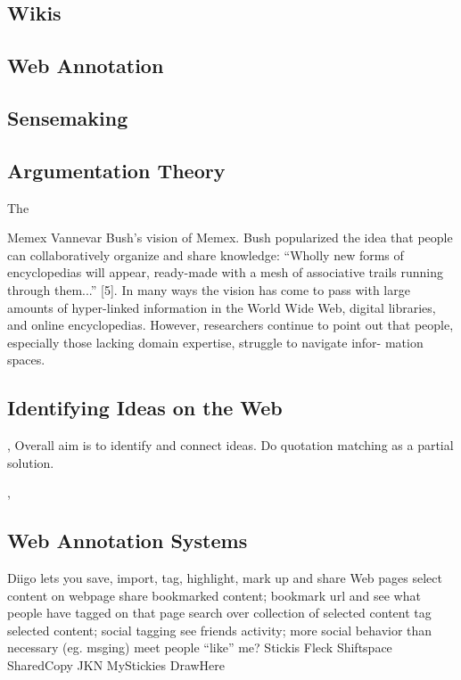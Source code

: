 \documentclass{chi2009}
\begin{document}
\subsection{Wikis}

\subsection{Web Annotation}

\subsection{Sensemaking}

\cite{scenthighlights}\cite{scenttrails}

\subsection{Argumentation Theory}

The 
\cite{Korb97acognitive}
\cite{toulmin}
\cite{carneades}
\cite{conceptmap}
\cite{argmas}

Memex
Vannevar 
Bush's vision of Memex. Bush popularized the idea that 
people can collaboratively organize and share knowledge: 
``Wholly new forms of encyclopedias will appear, ready-made 
with a mesh of associative trails running through them...'' 
[5]. In many ways the vision has come to pass with large 
amounts of hyper-linked information in the World Wide 
Web, digital libraries, and online encyclopedias. However, 
researchers continue to point out that people, especially 
those lacking domain expertise, struggle to navigate infor- 
mation spaces. 


\subsection{Identifying Ideas on the Web}

\cite{quotations}, \cite{quotationdl} Overall aim is to identify and connect ideas. Do quotation matching as a partial solution.

\cite{scenthighlights}

\cite{ideanavigation}, \cite{citesense}


\subsection{Web Annotation Systems}

\cite{personalweb}

Diigo lets you save, import, tag, highlight, mark up and share Web pages
	select content on webpage
	share bookmarked content; bookmark url and see what people have tagged on that page
	search over collection of selected content
	tag selected content; social tagging
	see friends activity; more social behavior than necessary (eg. msging)
	meet people ``like'' me?
Stickis
Fleck
Shiftspace
SharedCopy
JKN
MyStickies
DrawHere
\end{document}
